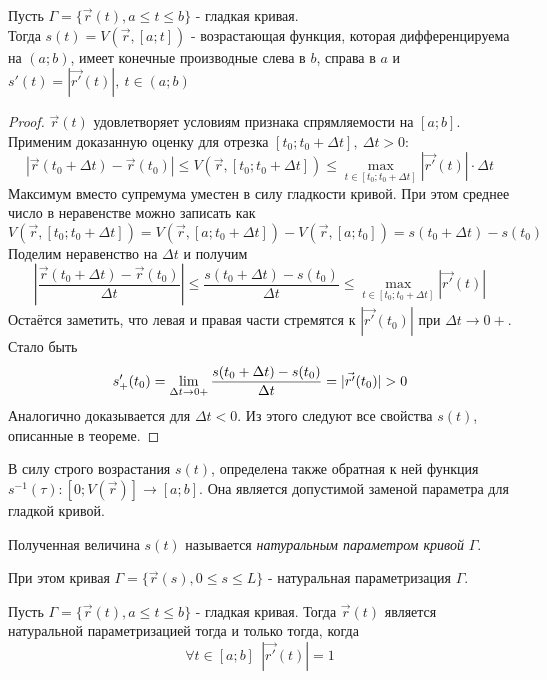 \begin{theorem}
	Пусть $\Gamma = \{\vec{r}(t), a \le t \le b\}$ - гладкая кривая.\\
	Тогда \(s(t) = V(\vec{r}, [a; t])\) - возрастающая функция, которая дифференцируема на $(a; b)$, имеет конечные производные слева в $b$, справа в $a$ и \(s'(t) = |\vec{r'}(t)|,\ t \in (a; b)\)
\end{theorem}

\begin{proof}
	$\vec{r}(t)$ удовлетворяет условиям признака спрямляемости на $[a; b]$. Применим доказанную оценку для отрезка $[t_0; t_0 + \Delta t],\ \Delta t > 0$:
	\[
		|\vec{r}(t_0 + \Delta t) - \vec{r}(t_0)| \le V(\vec{r}, [t_0; t_0 + \Delta t]) \le \max\limits_{t \in [t_0; t_0 + \Delta t]} |\vec{r'}(t)| \cdot \Delta t
	\]
	Максимум вместо супремума уместен в силу гладкости кривой. При этом среднее число в неравенстве можно записать как
	\[
		V(\vec{r}, [t_0; t_0 + \Delta t]) = V(\vec{r}, [a; t_0 + \Delta t]) - V(\vec{r}, [a; t_0]) = s(t_0 + \Delta t) - s(t_0)
	\]
	Поделим неравенство на $\Delta t$ и получим
	\[
		\left|\frac{\vec{r}(t_0 + \Delta t) - \vec{r}(t_0)}{\Delta t}\right| \le \frac{s(t_0 + \Delta t) - s(t_0)}{\Delta t} \le \max\limits_{t \in [t_0; t_0 + \Delta t]} |\vec{r'}(t)|
	\]
	Остаётся заметить, что левая и правая части стремятся к $|\vec{r'}(t_0)|$ при $\Delta t \to 0+$. Стало быть
	\[
		s'_+(t_0) = \lim\limits_{\Delta t \to 0+} \frac{s(t_0 + \Delta t) - s(t_0)}{\Delta t} = |\vec{r'}(t_0)| > 0
	\]
	Аналогично доказывается для $\Delta t < 0$. Из этого следуют все свойства $s(t)$, описанные в теореме.
\end{proof}

\begin{corollary}
	В силу строго возрастания $s(t)$, определена также обратная к ней функция $s^{-1}(\tau): [0; V(\vec{r})] \to [a; b]$. Она является допустимой заменой параметра для гладкой кривой.
\end{corollary}

\begin{definition}
	Полученная величина $s(t)$ называется \textit{натуральным параметром кривой} $\Gamma$.
	
	При этом кривая $\Gamma = \{\vec{r}(s), 0 \le s \le L\}$ - натуральная параметризация $\Gamma$.
\end{definition}

\begin{lemma}
	Пусть $\Gamma = \{\vec{r}(t), a \le t \le b\}$ - гладкая кривая. Тогда $\vec{r}(t)$ является натуральной параметризацией тогда и только тогда, когда
	\[
		\forall t \in [a; b]\ \ |\vec{r'}(t)| = 1
	\]
\end{lemma}

